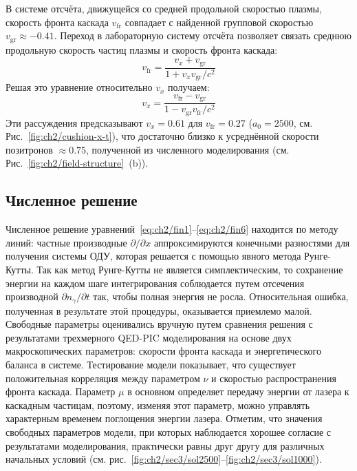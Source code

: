 В системе отсчёта, движущейся со средней продольной скоростью плазмы, скорость фронта каскада $v_\mathrm{fr}$ совпадает с найденной групповой скоростью $v_\mathrm{gr} \approx -0.41$.
Переход в лабораторную систему отсчёта позволяет связать среднюю продольную скорость частиц плазмы и скорость фронта каскада:
\begin{equation}
    v_\mathrm{fr}=\frac{v_x+v_\mathrm{gr}}{1+ v_x v_\mathrm{gr} /c^2} 
\label{vcf}
\end{equation}
Решая это уравнение относительно $v_x$ получаем:
\begin{equation}
    \label{vpl}
    v_x=\frac{v_\mathrm{fr}-v_\mathrm{gr}}{1-v_\mathrm{gr}v_\mathrm{fr}/c^2} 
\end{equation}
Эти рассуждения предсказывают $v_x=0.61$ для $v_\mathrm{fr} = 0.27$ ($a_{0}=2500$, см. Рис.~\ref{fig:ch2/cushion-x-t}), что достаточно близко к усреднённой скорости позитронов $\approx 0.75$, полученной из численного моделирования (см. Рис.~\ref{fig:ch2/field-structure}~(b)).

\subsection{Численное решение}
\label{sub:ch2/sec3/Numeric}

Численное решение уравнений~\eqref{eq:ch2/fin1}--\eqref{eq:ch2/fin6} находится по методу линий: частные производные $\partial/\partial x$ аппроксимируются конечными разностями для получения системы ОДУ, которая решается с помощью явного метода Рунге-Кутты.
Так как метод Рунге-Кутты не является симплектическим, то сохранение энергии на каждом шаге интегрирования соблюдается путем отсечения производной $\partial n_\gamma /\partial t$ так, чтобы полная энергия не росла.
Относительная ошибка, полученная в результате этой процедуры, оказывается приемлемо малой.
Свободные параметры оценивались вручную путем сравнения решения с результатами трехмерного QED-PIC моделирования на основе двух макроскопических параметров: скорости фронта каскада и энергетического баланса в системе.
Тестирование модели показывает, что существует положительная корреляция между параметром $\nu$ и скоростью распространения фронта каскада.
Параметр $\mu$ в основном определяет передачу энергии от лазера к каскадным частицам, поэтому, изменяя этот параметр, можно управлять характерным временем поглощения энергии лазера.
Отметим, что значения свободных параметров модели, при которых наблюдается хорошее согласие с результатами моделирования, практически равны друг другу для различных начальных условий (см. рис.~\ref{fig:ch2/sec3/sol2500}--\ref{fig:ch2/sec3/sol1000}).

